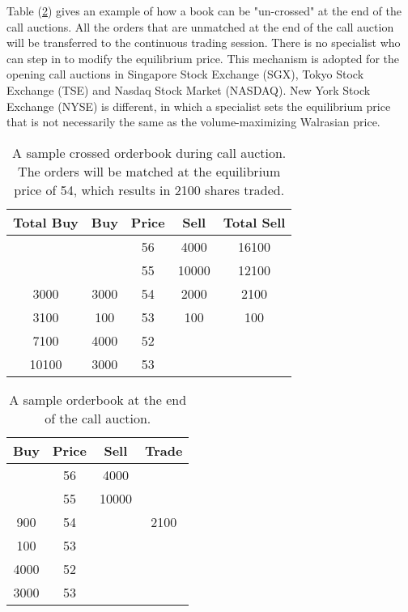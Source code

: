 Table (\ref{itayoseTable2}) gives an example of how a book can be "un-crossed" at the end of the call auctions. All the orders that are unmatched at the end of the call auction will be transferred to the continuous trading session. There is no specialist who can step in to modify the equilibrium price. This mechanism is adopted for the opening call auctions in Singapore Stock Exchange (SGX), Tokyo Stock Exchange (TSE) and Nasdaq Stock Market (NASDAQ). New York Stock Exchange (NYSE) is different, in which a specialist sets the equilibrium price that is not necessarily the same as the volume-maximizing Walrasian price.

\begin{table}[]
  \centering
  \begin{tabular}{c|c|c|c|c}
    \hline
    \textbf{Total Buy} & \textbf{Buy} & \textbf{Price} & \textbf{Sell} & \textbf{Total Sell} \\ \hline
                       &              & 56             & 4000          & 16100               \\ \hline
                       &              & 55             & 10000         & 12100               \\ \hline
    3000               & 3000         & 54             & 2000          & 2100                \\ \hline
    3100               & 100          & 53             & 100           & 100                 \\ \hline
    7100               & 4000         & 52             &               &                     \\ \hline
    10100              & 3000         & 53             &               &                     \\ \hline
  \end{tabular}

  \caption{A sample crossed orderbook during call auction. The orders will be matched at the equilibrium price of 54, which results in 2100 shares traded.}
  \label{itayoseTable1}
\end{table}


\begin{table}[]
  \centering
  \begin{tabular}{c|c|c|c}
    \hline
    \textbf{Buy} & \textbf{Price} & \textbf{Sell} & \textbf{Trade} \\ \hline
                 & 56             & 4000          &                \\ \hline
                 & 55             & 10000         &                \\ \hline
    900          & 54             &               & 2100           \\ \hline
    100          & 53             &               &                \\ \hline
    4000         & 52             &               &                \\ \hline
    3000         & 53             &               &                \\ \hline
  \end{tabular}
  \caption{A sample orderbook at the end of the call auction.}
  \label{itayoseTable2}
\end{table}


